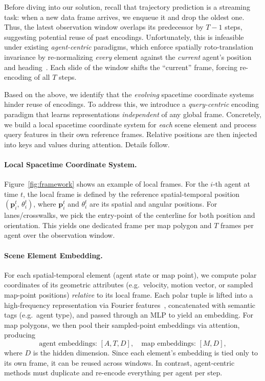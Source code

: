 Before diving into our solution, recall that trajectory prediction is a streaming task: when a new data frame arrives, we enqueue it and drop the oldest one.  Thus, the latest observation window overlaps its predecessor by $T-1$ steps, suggesting potential reuse of past encodings.  Unfortunately, this is infeasible under existing \emph{agent-centric} paradigms, which enforce spatially roto-translation invariance by re-normalizing \emph{every} element against the \emph{current} agent's position and heading~\cite{RotoTrans,AgentCentric}.  Each slide of the window shifts the “current” frame, forcing re-encoding of all $T$ steps.

Based on the above, we identify that the \emph{evolving} spacetime coordinate systems hinder reuse of encodings.  To address this, we introduce a \emph{query-centric} encoding paradigm that learns representations \emph{independent} of any global frame.  Concretely, we build a local spacetime coordinate system for \emph{each} scene element and process query features in their own reference frames.  Relative positions are then injected into keys and values during attention.  Details follow.

\paragraph{Local Spacetime Coordinate System.}
Figure~\ref{fig:framework} shows an example of local frames.  For the $i$-th agent at time $t$, the local frame is defined by the reference spatial-temporal position $(\mathbf{p}_i^t,\,\theta_i^t)$, where $\mathbf{p}_i^t$ and $\theta_i^t$ are its spatial and angular positions.  For lanes/crosswalks, we pick the entry-point of the centerline for both position and orientation.  This yields one dedicated frame per map polygon and $T$ frames per agent over the observation window.

\paragraph{Scene Element Embedding.}
For each spatial-temporal element (agent state or map point), we compute polar coordinates of its geometric attributes (e.g.\ velocity, motion vector, or sampled map-point positions) \emph{relative} to its local frame.  Each polar tuple is lifted into a high-frequency representation via Fourier features~\cite{TancikFourier,Nerf,Perceiver}, concatenated with semantic tags (e.g.\ agent type), and passed through an MLP to yield an embedding.  For map polygons, we then pool their sampled-point embeddings via attention, producing
\[
\text{agent embeddings: }[A,T,D],\quad
\text{map embeddings: }[M,D],
\]
where $D$ is the hidden dimension.  Since each element's embedding is tied only to its own frame, it can be reused across windows.  In contrast, agent-centric methods must duplicate and re-encode everything per agent per step.

